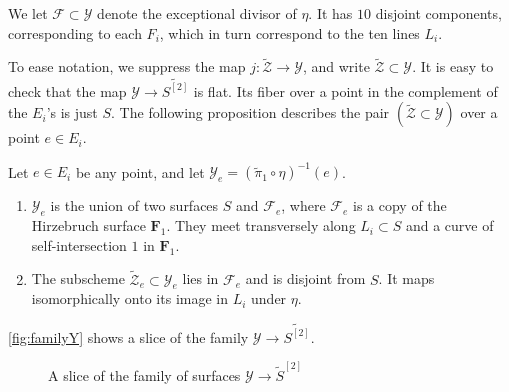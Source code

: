 \documentclass[12pt,reqno]{amsart}
\renewcommand{\to}{{\longrightarrow}}
\numberwithin{equation}{section}
\newcommand{\F}{\mathbf F}
\newcommand{\td}{\widetilde}
\begin{document}
We let $\mathcal{F} \subset \mathcal{Y}$ denote the exceptional
divisor of $\eta$. It has $10$ disjoint components, corresponding to
each $F_{i}$, which in turn correspond to the ten lines $L_{i}$.

To ease notation, we suppress the map $j \colon \widetilde{\mathcal Z} \to \mathcal Y$, and write $\widetilde{\mathcal Z} \subset \mathcal Y$.
It is easy to check that the map $\mathcal Y \to \widetilde{S^{[2]}}$ is flat.
Its fiber over a point in the complement of the $E_i$'s is just $S$.
The following proposition describes the pair $(\widetilde{\mathcal Z} \subset \mathcal Y)$ over a point $e \in E_i$.
\begin{proposition}
  \label{prop:geometry}
  Let $e \in E_{i}$ be any point, and let
  $\mathcal{Y}_{e} = (\td{\pi}_{1} \circ \eta)^{-1}(e)$.
  \begin{enumerate}
  \item $\mathcal{Y}_{e}$ is the union of two surfaces $S$ and $\mathcal F_e$, where $\mathcal F_e$ is a copy of the Hirzebruch surface $\F_1$.
    They meet transversely along $L_{i} \subset S$ and a curve of self-intersection $1$ in $\F_1$.
  \item The subscheme $\widetilde{\mathcal Z}_e \subset \mathcal Y_e$ lies in $\mathcal F_e$ and is disjoint from $S$.
    It maps isomorphically onto its image in $L_{i}$ under $\eta$.
  \end{enumerate}
\end{proposition}
\autoref{fig:familyY} shows a slice of the family $\mathcal Y \to \widetilde{S^{[2]}}$.
\begin{figure}
  \centering
    
    \caption{A slice of the family of surfaces $\mathcal Y \to \widetilde S^{[2]}$}
    \label{fig:familyY}
\end{figure}
\end{document}
